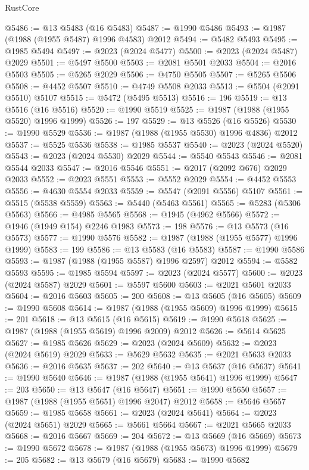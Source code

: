 \begin{lexlean}{RustCore}
\begin{coremodule}
@5486 := @13 @5483 (@16 @5483)
@5487 := @1990 @5486
@5493 := @1987 (@1988 (@1955 @5487) @1996 @4583) @2012
@5494 := @5482 @5493
@5495 := @1985 @5494
@5497 := @2023 (@2024 @5477)
@5500 := @2023 (@2024 @5487) @2029
@5501 := @5497 @5500
@5503 := @2081 @5501 @2033
@5504 := @2016 @5503
@5505 := @5265 @2029
@5506 := @4750 @5505
@5507 := @5265 @5506
@5508 := @4452 @5507
@5510 := @4749 @5508 @2033
@5513 := @5504 (@2091 @5510) @5107
@5515 := @5472 (@5495 @5513)
@5516 := 196
@5519 := @13 @5516 (@16 @5516)
@5520 := @1990 @5519
@5525 := @1987 (@1988 (@1955 @5520) @1996 @1999)
@5526 := 197
@5529 := @13 @5526 (@16 @5526)
@5530 := @1990 @5529
@5536 := @1987 (@1988 (@1955 @5530) @1996 @4836) @2012
@5537 := @5525 @5536
@5538 := @1985 @5537
@5540 := @2023 (@2024 @5520)
@5543 := @2023 (@2024 @5530) @2029
@5544 := @5540 @5543
@5546 := @2081 @5544 @2033
@5547 := @2016 @5546
@5551 := @2017 (@2092 @676) @2029 @2033
@5552 := @2023 @5551
@5553 := @5552 @2029
@5554 := @4452 @5553
@5556 := @4630 @5554 @2033
@5559 := @5547 (@2091 @5556) @5107
@5561 := @5515 (@5538 @5559)
@5563 := @5440 (@5463 @5561)
@5565 := @5283 (@5306 @5563)
@5566 := @4985 @5565
@5568 := @1945 (@4962 @5566)
@5572 := @1946 (@1949 @154) @2246 @1983
@5573 := 198
@5576 := @13 @5573 (@16 @5573)
@5577 := @1990 @5576
@5582 := @1987 (@1988 (@1955 @5577) @1996 @1999)
@5583 := 199
@5586 := @13 @5583 (@16 @5583)
@5587 := @1990 @5586
@5593 := @1987 (@1988 (@1955 @5587) @1996 @2597) @2012
@5594 := @5582 @5593
@5595 := @1985 @5594
@5597 := @2023 (@2024 @5577)
@5600 := @2023 (@2024 @5587) @2029
@5601 := @5597 @5600
@5603 := @2021 @5601 @2033
@5604 := @2016 @5603
@5605 := 200
@5608 := @13 @5605 (@16 @5605)
@5609 := @1990 @5608
@5614 := @1987 (@1988 (@1955 @5609) @1996 @1999)
@5615 := 201
@5618 := @13 @5615 (@16 @5615)
@5619 := @1990 @5618
@5625 := @1987 (@1988 (@1955 @5619) @1996 @2009) @2012
@5626 := @5614 @5625
@5627 := @1985 @5626
@5629 := @2023 (@2024 @5609)
@5632 := @2023 (@2024 @5619) @2029
@5633 := @5629 @5632
@5635 := @2021 @5633 @2033
@5636 := @2016 @5635
@5637 := 202
@5640 := @13 @5637 (@16 @5637)
@5641 := @1990 @5640
@5646 := @1987 (@1988 (@1955 @5641) @1996 @1999)
@5647 := 203
@5650 := @13 @5647 (@16 @5647)
@5651 := @1990 @5650
@5657 := @1987 (@1988 (@1955 @5651) @1996 @2047) @2012
@5658 := @5646 @5657
@5659 := @1985 @5658
@5661 := @2023 (@2024 @5641)
@5664 := @2023 (@2024 @5651) @2029
@5665 := @5661 @5664
@5667 := @2021 @5665 @2033
@5668 := @2016 @5667
@5669 := 204
@5672 := @13 @5669 (@16 @5669)
@5673 := @1990 @5672
@5678 := @1987 (@1988 (@1955 @5673) @1996 @1999)
@5679 := 205
@5682 := @13 @5679 (@16 @5679)
@5683 := @1990 @5682

\end{coremodule}
\end{lexlean}
